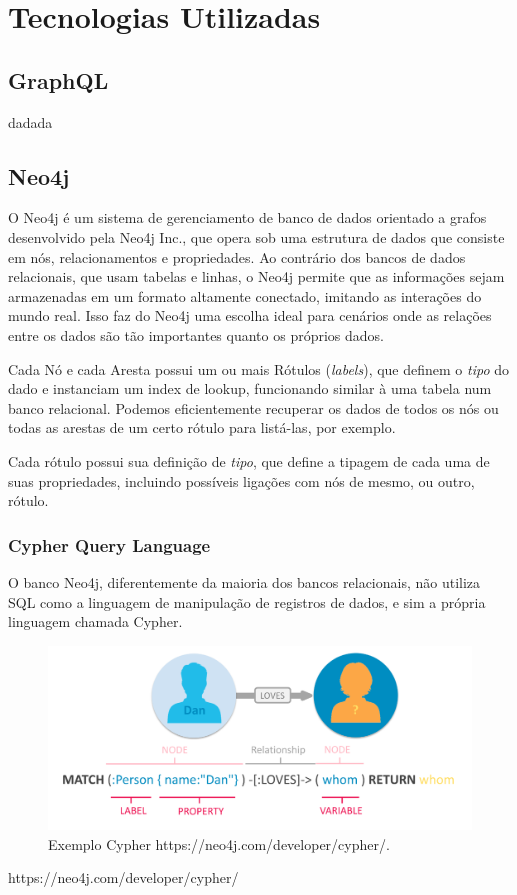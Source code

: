 \chapter{Tecnologias Utilizadas}
\label{chap3}

\section{GraphQL}

dadada


\section{Neo4j}
O Neo4j é um sistema de gerenciamento de banco de dados orientado a grafos desenvolvido pela Neo4j Inc., que opera sob uma estrutura de dados que consiste em nós, relacionamentos e propriedades. Ao contrário dos bancos de dados relacionais, que usam tabelas e linhas, o Neo4j permite que as informações sejam armazenadas em um formato altamente conectado, imitando as interações do mundo real. Isso faz do Neo4j uma escolha ideal para cenários onde as relações entre os dados são tão importantes quanto os próprios dados.

 
Cada Nó e cada Aresta possui um ou mais Rótulos (\textit{labels}), que definem o \textit{tipo} do dado e instanciam um index de lookup, funcionando similar à uma tabela num banco relacional. Podemos eficientemente recuperar os dados de todos os nós ou todas as arestas de um certo rótulo para listá-las, por exemplo.

Cada rótulo possui sua definição de \textit{tipo}, que define a tipagem de cada uma de suas propriedades, incluindo possíveis ligações com nós de mesmo, ou outro, rótulo.

\subsection{Cypher Query Language}

O banco Neo4j, diferentemente da maioria dos bancos relacionais, não utiliza SQL como a linguagem de manipulação de registros de dados, e sim a própria linguagem chamada Cypher.

\begin{figure}[H]
    \centering
    \includegraphics[width=1.0\linewidth]{Imagens/chap03/cypher-exemple.png}
    \caption{Exemplo Cypher https://neo4j.com/developer/cypher/.}
    \label{fig:profile-exemple}
\end{figure}
https://neo4j.com/developer/cypher/


